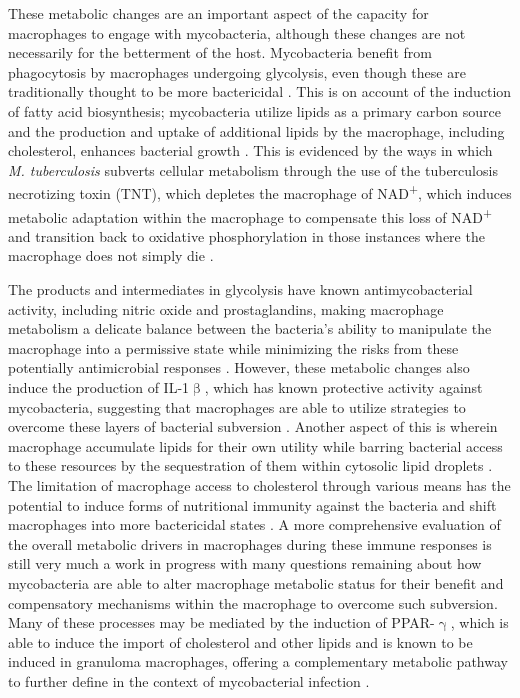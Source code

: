 These metabolic changes are an important aspect of the capacity for macrophages to engage with mycobacteria, although these changes are not necessarily for the betterment of the host. Mycobacteria benefit from phagocytosis by macrophages undergoing glycolysis, even though these are traditionally thought to be more bactericidal \citep{Escoll2019, Mehrotra2014, Shi2019}. This is on account of the induction of fatty acid biosynthesis; mycobacteria utilize lipids as a primary carbon source and the production and uptake of additional lipids by the macrophage, including cholesterol, enhances bacterial growth \citep{Gatfield2000, Nazarova2019, Yan2020}. This is evidenced by the ways in which \textit{M. tuberculosis} subverts cellular metabolism through the use of the tuberculosis necrotizing toxin (TNT), which depletes the macrophage of NAD\textsuperscript{+}, which induces metabolic adaptation within the macrophage to compensate this loss of NAD\textsuperscript{+} and transition back to oxidative phosphorylation in those instances where the macrophage does not simply die \citep{Howard2020}. 

The products and intermediates in glycolysis have known antimycobacterial activity, including nitric oxide and prostaglandins, making macrophage metabolism a delicate balance between the bacteria's ability to manipulate the macrophage into a permissive state while minimizing the risks from these potentially antimicrobial responses \citep{OsadaOka2019}. However, these metabolic changes also induce the production of IL\hyp{}1$\upbeta$, which has known protective activity against mycobacteria, suggesting that macrophages are able to utilize strategies to overcome these layers of bacterial subversion \citep{Corcoran2016, Ogryzko2019, Fremond2007, Shi2019}. Another aspect of this is wherein macrophage accumulate lipids for their own utility while barring bacterial access to these resources by the sequestration of them within cytosolic lipid droplets \citep{Laval2021, Knight2018}. The limitation of macrophage access to cholesterol through various means has the potential to induce forms of nutritional immunity against the bacteria and shift macrophages into more bactericidal states \citep{Babunovic2022, Pandey2008, Yang2014c}. A more comprehensive evaluation of the overall metabolic drivers in macrophages during these immune responses is still very much a work in progress with many questions remaining about how mycobacteria are able to alter macrophage metabolic status for their benefit and compensatory mechanisms within the macrophage to overcome such subversion. Many of these processes may be mediated by the induction of PPAR\hyp{}$\upgamma$, which is able to induce the import of cholesterol and other lipids and is known to be induced in granuloma macrophages, offering a complementary metabolic pathway to further define in the context of mycobacterial infection \citep{Chawla2001}.

